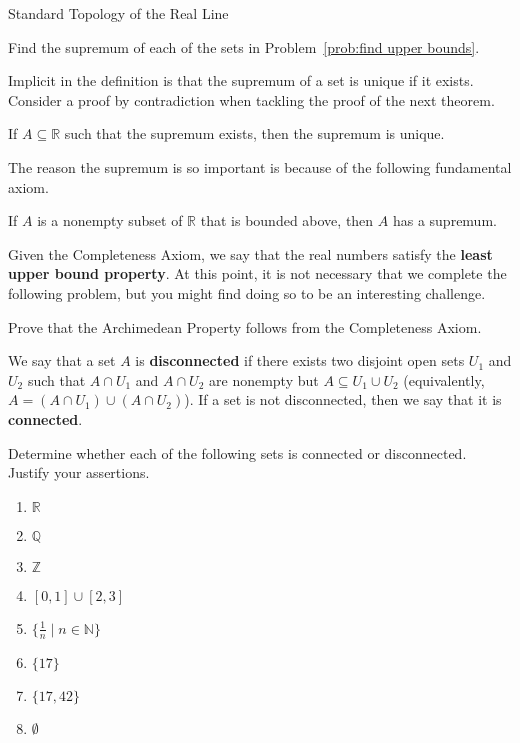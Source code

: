 \begin{section}{Standard Topology of the Real Line}
\begin{problem}
Find the supremum of each of the sets in Problem~\ref{prob:find upper bounds}.
\end{problem}

Implicit in the definition is that the supremum of a set is unique if it exists. Consider a proof by contradiction when tackling the proof of the next theorem.

\begin{theorem}
If $A\subseteq \mathbb{R}$ such that the supremum exists, then the supremum is unique.
\end{theorem}

The reason the supremum is so important is because of the following fundamental axiom.

\begin{axiom}\label{axiom:completeness}
If $A$ is a nonempty subset of $\mathbb{R}$ that is bounded above, then $A$ has a supremum.
\end{axiom}

Given the Completeness Axiom, we say that the real numbers satisfy the \textbf{least upper bound property}. At this point, it is not necessary that we complete the following problem, but you might find doing so to be an interesting challenge.

\begin{problem}
Prove that the Archimedean Property follows from the Completeness Axiom.
\end{problem}

\begin{definition}
We say that a set $A$ is \textbf{disconnected} if there exists two disjoint open sets $U_1$ and $U_2$ such that $A\cap U_1$ and $A\cap U_2$ are nonempty but $A\subseteq U_1\cup U_2$ (equivalently, $A=(A\cap U_1)\cup(A\cap U_2)$). If a set is not disconnected, then we say that it is \textbf{connected}.
\end{definition}

\begin{problem}
Determine whether each of the following sets is connected or disconnected.  Justify your assertions.
\begin{multicols}{2}
\begin{enumerate}[label=\textrm{(\alph*)}]
\item $\mathbb{R}$
\item $\mathbb{Q}$
\item $\mathbb{Z}$
\item $[0,1]\cup [2,3]$
\item $\{\frac{1}{n}\mid n\in\mathbb{N}\}$
\item $\{17\}$
\item $\{17,42\}$
\item $\emptyset$
\end{enumerate}
\end{multicols}
\end{problem}


\end{section}
